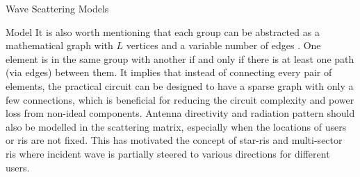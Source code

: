 \begin{section}{}
\begin{subsection}{Wave Scattering Models}
\begin{subsubsection}{ Model}
			It is also worth mentioning that each group can be abstracted as a mathematical graph with $L$ vertices and a variable number of edges \cite{Nerini2023a}.
			One element is in the same group with another if and only if there is at least one path (via edges) between them.
			It implies that instead of connecting every pair of elements, the practical circuit can be designed to have a sparse graph with only a few connections, which is beneficial for reducing the circuit complexity and power loss from non-ideal components.
			Antenna directivity and radiation pattern should also be modelled in the scattering matrix, especially when the locations of users or \gls{ris} are not fixed.
			This has motivated the concept of \gls{star}-\gls{ris} \cite{Mu2021,Liu2021} and multi-sector \gls{ris} \cite{Li2023c} where incident wave is partially steered to various directions for different users.
		\end{subsubsection}
	\end{subsection}
\end{section}

